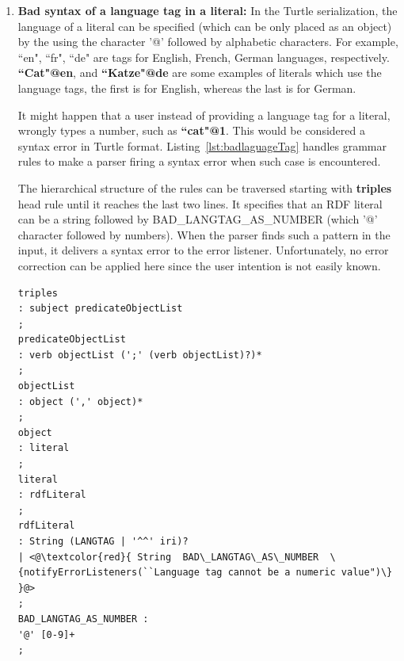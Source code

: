 \begin{enumerate}
\begin{lstlisting}[label=lst:MissuseAex ,  caption={Grammar rules for detecting misuse of 'A' as a predicate instead of 'a'.}] 
statement
: directive
| triples '.'
;
triples
: subject predicateObjectList
;
predicateObjectList
: verb objectList (';' (verb objectList)?)*
;
verb
:'a'
| <@\textcolor{red}{'A' \{notifyErrorListeners(``'A' cannot be used as predicate,         }@> 
<@\textcolor{red}{
it should be replaced with 'a'")\}} @>
;
\end{lstlisting}

\item \textbf{Bad syntax of a language tag in a literal:} 
In the Turtle serialization, the language of a literal can be specified (which can be only placed as an object) by the using the character '@' followed by alphabetic characters. For example, ``en", ``fr", ``de" are tags for English, French, German languages, respectively. 
\textbf{``Cat"@en}, and \textbf{``Katze"@de} are some examples of literals which use the language tags, the first is for English, whereas the last is for German. 


It might happen that a user instead of providing a language tag for a literal, wrongly types a number, such as \textbf{``cat"@1}.
This would be considered a syntax error in Turtle format. 
Listing~\ref{lst:badlaguageTag} handles grammar rules to make a parser firing a syntax error when such case is encountered. 

The hierarchical structure of the rules can be traversed starting with \textbf{triples} head rule until it reaches the last two lines.
It specifies that an RDF literal can be a string followed by BAD\_LANGTAG\_AS\_NUMBER (which '@' character followed by numbers). 
When the parser finds such a pattern in the input, it delivers a syntax error to the error listener. 
Unfortunately, no error correction can be applied here since the user intention is not easily known.  

\begin{lstlisting}[label=lst:badlaguageTag,  caption={Grammar rules for detecting incorrect language tag with a number instead of characters.}] 
triples
: subject predicateObjectList
;
predicateObjectList
: verb objectList (';' (verb objectList)?)*
;
objectList
: object (',' object)*
;
object
: literal
;
literal
: rdfLiteral
;
rdfLiteral
: String (LANGTAG | '^^' iri)?
| <@\textcolor{red}{ String  BAD\_LANGTAG\_AS\_NUMBER  \{notifyErrorListeners(``Language tag cannot be a numeric value")\} }@>
;
BAD_LANGTAG_AS_NUMBER : 
'@' [0-9]+
;
\end{lstlisting}
\end{enumerate}
